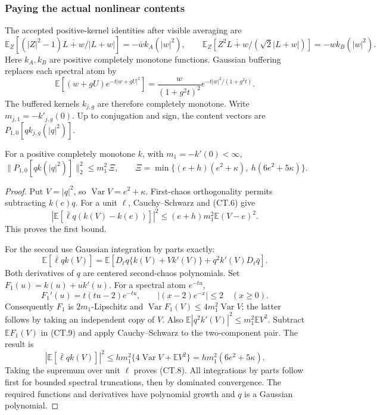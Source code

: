 \subsubsection{Paying the actual nonlinear contents}
\label{sec:ct-content}
The accepted positive-kernel identities after visible averaging are
\[
 \mathbb E_Z[(|Z|^2-1)\overline{L+w}/|L+w|]
       =-\bar w k_A(|w|^2),\qquad
 \mathbb E_Z[Z^2\overline{L+w}/(\sqrt2|L+w|)]
       =-w k_B(|w|^2).
\]
Here \(k_A,k_B\) are positive completely monotone functions.
Gaussian buffering replaces each spectral atom by
\[
 \mathbb E[(w+gU)e^{-t|w+gU|^2}]
   =\frac{w}{(1+g^2t)^2}
           e^{-t|w|^2/(1+g^2t)}.
\]
The buffered kernels \(k_{j,g}\) are therefore completely monotone.
Write \(m_{j,1}=-k'_{j,g}(0)\).
Up to conjugation and sign, the content vectors are
\(P_{1,0}[qk_{j,g}(|q|^2)]\).

\begin{lemma}
For a positive completely monotone \(k\), with \(m_1=-k'(0)<\infty\),
\[
 \boxed{\|P_{1,0}[qk(|q|^2)]\|_2^2\le m_1^2\,\Xi,\qquad
 \Xi=\min\{(e+h)(e^2+\kappa),\ h(6e^2+5\kappa)\}.}
 \tag{CT.8}
\]
\end{lemma}
\begin{proof}
Put \(V=|q|^2\), so \(\operatorname{Var}V=e^2+\kappa\).
First-chaos orthogonality permits subtracting \(k(e)q\).
For a unit \(\ell\), Cauchy--Schwarz and (CT.6) give
\[
 |\mathbb E[\bar\ell q(k(V)-k(e))]|^2
 \le (e+h)m_1^2\mathbb E(V-e)^2.
\]
This proves the first bound.

For the second use Gaussian integration by parts exactly:
\[
 \mathbb E[\bar\ell qk(V)]
 =\mathbb E[D_\ell q\{k(V)+Vk'(V)\}
              +q^2k'(V)D_\ell\bar q].
 \tag{CT.9}
\]
Both derivatives of \(q\) are centered second-chaos polynomials.
Set \(F_1(u)=k(u)+uk'(u)\).
For a spectral atom \(e^{-tu}\),
\[
 F_1'(u)=t(tu-2)e^{-tu},\qquad
 |(x-2)e^{-x}|\le2\quad(x\ge0).
\]
Consequently \(F_1\) is \(2m_1\)-Lipschitz and
\(\operatorname{Var}F_1(V)\le4m_1^2\operatorname{Var}V\);
the latter follows by taking an independent copy of \(V\).
Also \(\mathbb E|q^2k'(V)|^2\le m_1^2\mathbb E V^2\).
Subtract \(\mathbb EF_1(V)\) in (CT.9) and apply Cauchy--Schwarz
to the two-component pair. The result is
\[
 |\mathbb E[\bar\ell qk(V)]|^2
 \le h m_1^2\{4\operatorname{Var}V+\mathbb EV^2\}
 =h m_1^2(6e^2+5\kappa).
\]
Taking the supremum over unit \(\ell\) proves (CT.8).
All integrations by parts follow first for bounded spectral
truncations, then by dominated convergence. The required functions
and derivatives have polynomial growth and \(q\) is a Gaussian
polynomial.
\end{proof}

